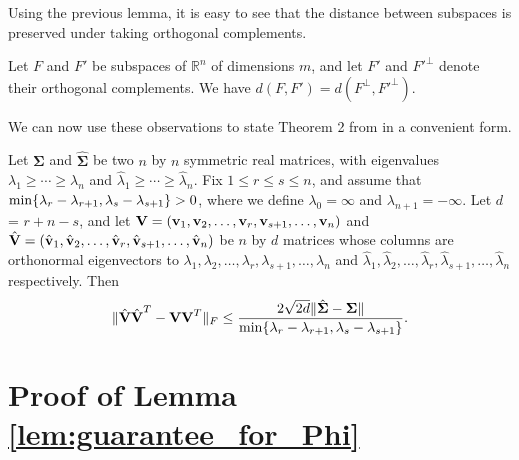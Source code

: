\documentclass[final,12pt]{colt2018} %
\numberwithin{equation}{section}
\DeclarePairedDelimiter{\norm}{\lVert}{\rVert}
\DeclarePairedDelimiter{\paren}{(}{)}
\DeclarePairedDelimiter{\braces}{\lbrace}{\rbrace}
\newcommand{\R}{\mathbb{R}}
\newcommand{\boldv}{\textbf{v}}
\newcommand{\boldSigma}{\boldsymbol{\Sigma}}
\begin{document}
Using the previous lemma, it is easy to see that the distance between subspaces is preserved under taking orthogonal complements.

\begin{lemma}
	Let $F$ and $F'$ be subspaces of $\R^n$ of dimensions $m$, and let $F'$ and $F'^\perp$ denote their orthogonal complements. We have $d(F,F') = d(F^\perp,F'^\perp)$.
\end{lemma}

We can now use these observations to state Theorem 2 from \cite{Yu2015} in a convenient form.

\begin{theorem} \label{thm:Davis-Kahan}
	Let $\boldSigma$ and $\hat{\boldSigma}$ be two $n$ by $n$ symmetric real matrices, with eigenvalues $\lambda_1 \geq \cdots \geq \lambda_n$ and $\hat{\lambda}_1 \geq \cdots \geq \hat{\lambda}_n$. Fix $1 \leq r \leq s \leq n$, and assume that $\min\braces{\lambda_r-\lambda_{r+1},\lambda_s-\lambda_{s+1}} > 0$, where we define $\lambda_0 = \infty$ and $\lambda_{n+1} = - \infty$. Let $d$ = $r+n-s$, and let $\textbf{V} = \paren{\boldv_1,\boldv_2,\ldots,\boldv_r,\boldv_{s+1},\ldots,\boldv_n}$ and $\hat{\textbf{V}} = \paren{\hat{\boldv}_1,\hat{\boldv}_2,\ldots,\hat{\boldv}_r,\hat{\boldv}_{s+1},\ldots,\hat{\boldv}_n}$ be $n$ by $d$ matrices whose columns are orthonormal eigenvectors to $\lambda_1,\lambda_2,\ldots,\lambda_r,\lambda_{s+1},\ldots,\lambda_n$ and $\hat{\lambda}_1,\hat{\lambda}_2,\ldots,\hat{\lambda}_r,\hat{\lambda}_{s+1},\ldots,\hat{\lambda}_n$ respectively. Then
	\begin{equation}
	\norm{\hat{\textbf{\textbf{V}}}\hat{\textbf{V}}^T - \textbf{V}\textbf{V}^T}_F \leq \frac{2\sqrt{2d}\norm{\hat{\boldSigma}-\boldSigma}}{\min\braces{\lambda_r-\lambda_{r+1},\lambda_s-\lambda_{s+1}}}.
	\end{equation}
\end{theorem}

\section{Proof of Lemma \ref{lem:guarantee_for_Phi}} \label{sec:proof_of_guarantee_for_Phi}
\end{document}
